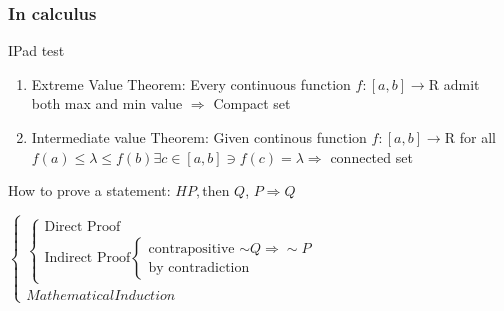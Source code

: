 


\cfoot{\thepage} %

\subsubsection{In calculus}

IPad test

\begin{enumerate}
	\item Extreme Value Theorem: Every continuous function $f:[a,b]\rightarrow\mathrm{R}$ admit both max and min value $\Rightarrow$ Compact set
	\item Intermediate value Theorem: Given continous function $f:[a,b]\rightarrow \mathrm{R}$ for all $f(a) \leq \lambda \leq f(b) \exists c \in [a,b] \ni f(c) = \lambda \Rightarrow$ connected set
\end{enumerate}

How to prove a statement: $H P,$then $Q$, $P \Rightarrow Q$

$\begin{cases}
	\begin{cases}
	\text{Direct Proof}\\\text{Indirect Proof}\begin{cases}\text{contrapositive $\sim Q \Rightarrow \sim P$} \\ \text{by contradiction}\end{cases}
	\end{cases}\\
	Mathematical Induction
\end{cases}$


\newpage


